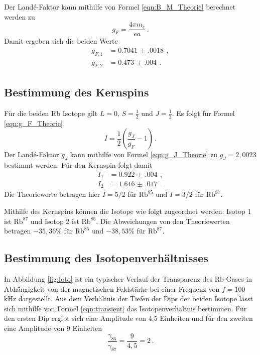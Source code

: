 Der Landé-Faktor kann mithilfe von Formel \eqref{eqn:B_M_Theorie} berechnet werden zu
\begin{equation*}
  g_F=\frac{4\pi m_e}{e a} \,.
\end{equation*}
Damit ergeben sich die beiden Werte
\begin{align*}
  g_{F,1}&= \SI{0.7041(0018)}{}\,,\\
  g_{F,2}&= \SI{0.473(004)}{}\,.
\end{align*}

\subsection{Bestimmung des Kernspins}
\label{subsec:Kernspin}

Für die beiden Rb Isotope gilt $L=0$, $S=\frac{1}{2}$ und $J=\frac{1}{2}$.
Es folgt für Formel \eqref{eqn:g_F_Theorie}
\begin{equation*}
  I=\frac{1}{2}\left(\frac{g_J}{g_F}-1\right) \,.
\end{equation*}
Der Landé-Faktor $g_J$ kann mithilfe von Formel \ref{eqn:g_J_Theorie} zu $g_J=2{,}0023$ bestimmt
werden. Für den Kernspin folgt damit
\begin{align*}
  I_1&= \SI{0.922(004)}{}\,,\\
  I_2&= \SI{1.616(017)}{}\,.
\end{align*}
Die Theoriewerte betragen hier $I=5/2$ für $\text{Rb}^{85}$ und $I=3/2$ für $\text{Rb}^{87}$.

Mithilfe des Kernspins können die Isotope wie folgt zugeordnet werden: Isotop 1 ist $\text{Rb}^{87}$
und Isotop 2 ist $\text{Rb}^{85}$. Die Abweichungen von den Theoriewerten betragen
$-35{,}36\%$ für $\text{Rb}^{85}$ und $-38{,}53\%$ für $\text{Rb}^{87}$.


\subsection{Bestimmung des Isotopenverhältnisses}
\label{subsec:Isotope}
In Abbildung \ref{fig:foto} ist ein typischer Verlauf der Transparenz des Rb-Gases in Abhängigkeit
von der magnetischen Feldstärke bei einer Frequenz von $f=100\,$kHz dargestellt.
Aus dem Verhältnis der Tiefen der Dips der beiden
Isotope lässt sich mithilfe von Formel \ref{eqn:transient} das Isotopenverhältnis bestimmen.
Für den ersten Dip ergibt sich eine Amplitude von 4{,}5 Einheiten und für den zweiten
eine Amplitude von 9 Einheiten
\begin{equation}
  \frac{\gamma_{85}}{\gamma_{87}}=\frac{9}{4{,}5}= 2 \,.
\end{equation}


